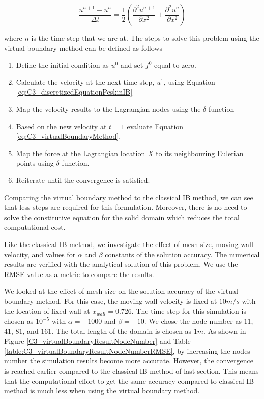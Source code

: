 \begin{equation}\label{eq:C3_virtualBoundaryDiscretization}
	\frac{u^{n+1} - u^n}{\Delta t} = 
	\frac{1}{2}
	\left(
	\frac{\partial^2 u^{n+1}}{\partial x^2} +
	\frac{\partial^2 u^{n}}{\partial x^2}
	\right)
\end{equation}

where $n$ is the time step that we are at. The steps to solve this problem using the virtual boundary method can be defined as follows

\begin{enumerate}
	\item Define the initial condition as $u^0$ and set $f^0$ equal to zero.
	\item Calculate the velocity at the next time step, $u^1$, using Equation \eqref{eq:C3_discretizedEquationPeskinIB}
	\item Map the velocity results to the Lagrangian nodes using the $\delta$ function
	\item Based on the new velocity at $t=1$ evaluate Equation \eqref{eq:C3_virtualBoundaryMethod}.
	\item Map the force at the Lagrangian location $X$ to its neighbouring Eulerian points using $\delta$ function.
	\item Reiterate until the convergence is satisfied.
\end{enumerate}

Comparing the virtual boundary method to the classical IB method, we can see that less steps are required for this formulation. Moreover, there is no need to solve the constitutive equation for the solid domain which reduces the total computational cost.

Like the classical IB method, we investigate the effect of mesh size, moving wall velocity, and values for $\alpha$ and $\beta$ constants of the solution accuracy. The numerical results are verified with the analytical solution of this problem. We use the RMSE value as a metric to compare the results.

We looked at the effect of mesh size on the solution accuracy of the virtual boundary method. For this case, the moving wall velocity is fixed at $10 m/s$ with the location of fixed wall at $x_{wall} = 0.726$. The time step for this simulation is chosen as $10^{-5}$ with $\alpha = -1000$ and $\beta = -10$. We chose the node number as $11$, $41$, $81$, and $161$. The total length of the domain is chosen as $1 m$. As shown in Figure \ref{C3_virtualBoundaryResultNodeNumber} and Table \ref{table:C3_virtualBoundaryResultNodeNumberRMSE}, by increasing the nodes number the simulation results become more accurate. However, the convergence is reached earlier compared to the classical IB method of last section. This means that the computational effort to get the same accuracy compared to classical IB method is much less when using the virtual boundary method. 

